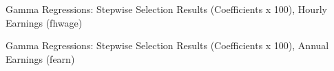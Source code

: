 \documentclass[12pt]{article}
\begin{document}
\begin{onehalfspace}








\begin{table}[H]
    \centering
    \caption{Gamma Regressions: Stepwise Selection Results (Coefficients x 100), Hourly Earnings (fhwage)}
    \label{tab:gamma_stepwise}
    \resizebox{\textwidth}{!}{%
        
    }
\end{table}

\begin{table}[H]
    \centering
    \caption{Gamma Regressions: Stepwise Selection Results (Coefficients x 100), Annual Earnings (fearn)}
    \label{tab:gamma_fearn_stepwise}
    \resizebox{\textwidth}{!}{%
        
    }
\end{table}






\end{onehalfspace}
\end{document}
